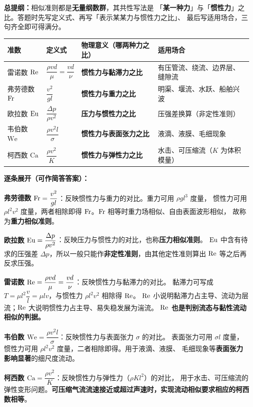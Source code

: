 \begin{jie}
\textbf{总提纲：}相似准则都是\textbf{无量纲数群}，其共性写法是
「\textbf{某一种力}」与「\textbf{惯性力}」之比。答题时先写定义式、再写「表示某某力与惯性力之比」、
最后写适用场合，三句齐全即可得满分。

\begin{center}
\begin{tabularx}{\textwidth}{@{}llXl@{}}
\toprule
准数 & 定义式 & 物理意义（哪两种力之比） & 适用场合 \\
\midrule
雷诺数 $\mathrm{Re}$ & $\dfrac{\rho v d}{\mu}=\dfrac{v d}{\nu}$ & \textbf{惯性力与黏滞力之比} & 有压管流、绕流、边界层、缝隙流 \\
弗劳德数 $\mathrm{Fr}$ & $\dfrac{v^{2}}{gl}$ & \textbf{惯性力与重力之比} & 明渠、堰流、水跃、船舶兴波 \\
欧拉数 $\mathrm{Eu}$ & $\dfrac{\Delta p}{\rho v^{2}}$ & \textbf{压力与惯性力之比} & 压强差换算（非定性准则） \\
韦伯数 $\mathrm{We}$ & $\dfrac{\rho v^{2}l}{\sigma}$ & \textbf{惯性力与表面张力之比} & 液滴、液膜、毛细现象 \\
柯西数 $\mathrm{Ca}$ & $\dfrac{\rho v^{2}}{K}$ & \textbf{惯性力与弹性力之比} & 水击、可压缩流（$K$ 为体积模量） \\
\bottomrule
\end{tabularx}
\end{center}

\textbf{逐条展开（可作简答答案）：}
\begin{xiaowen}
\item \textbf{弗劳德数 $\mathrm{Fr}=\dfrac{v^{2}}{gl}$}：反映惯性力与重力的对比。重力可用 $\rho g l^{3}$ 度量，
惯性力可用 $\rho l^{2}v^{2}$ 度量，两者相除即得 $\mathrm{Fr}$。$\mathrm{Fr}$ 相等时重力场相似、自由表面波形相似，
故称为\textbf{重力相似准则}。
\item \textbf{欧拉数 $\mathrm{Eu}=\dfrac{\Delta p}{\rho v^{2}}$}：反映压力与惯性力的对比，也称\textbf{压力相似准则}。
$\mathrm{Eu}$ 中含有待求的压强差 $\Delta p$，所以一般只能作\textbf{非定性准则}，由其他定性准则算出 $\mathrm{Re}$ 等之后再反求压强。
\item \textbf{雷诺数 $\mathrm{Re}=\dfrac{\rho v d}{\mu}=\dfrac{v d}{\nu}$}：反映惯性力与黏滞力的对比。
黏滞力可写成 $T=\mu l^{2}\dfrac{v}{l}=\mu l v$，与惯性力 $\rho l^{2}v^{2}$ 相除得 $\mathrm{Re}$。
$\mathrm{Re}$ 小说明黏滞力占主导、流动为层流；$\mathrm{Re}$ 大说明惯性力占主导、易失稳发展为湍流。
\textbf{$\mathrm{Re}$ 也是判别流态与黏性流动相似的判据。}
\item \textbf{韦伯数 $\mathrm{We}=\dfrac{\rho v^{2}l}{\sigma}$}：反映惯性力与表面张力 $\sigma$ 的对比。
表面张力可用 $\sigma l$ 度量，惯性力可用 $\rho l^{2}v^{2}$ 度量，二者相除即得。用于液滴、液膜、
毛细现象等\textbf{表面张力影响显著}的细尺度流动。
\item \textbf{柯西数 $\mathrm{Ca}=\dfrac{\rho v^{2}}{K}$}：反映惯性力与弹性力（$\rho K l^{2}$）的对比，
用于水击、可压缩流的弹性变形问题。\textbf{可压缩气流流速接近或超过声速时，实现流动相似要求相应的柯西数相等}。
\end{xiaowen}


\end{jie}
